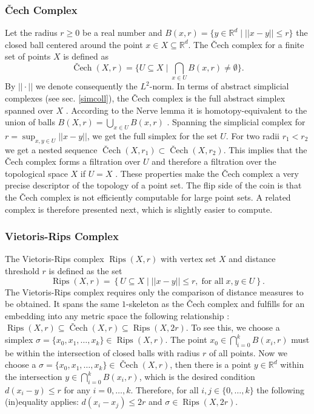 \documentclass[runningheads]{llncs}
\DeclareMathOperator{\Cech}{\text{\v{C}ech}}
\DeclareMathOperator{\Rips}{\text{Rips}}
\begin{document}
\subsubsection{\v{C}ech Complex \cite{bauer2017morse}} Let the radius $r \geq 0$ be a real number and $B(x,r) = \{y \in \mathbb{R}^d \; | \; ||x-y|| \leq r\}$ the closed ball centered around the point $x \in X \subseteq \mathbb{R}^d$. The \v{C}ech complex for a finite set of points $X$ is defined as
\begin{equation}
  \Cech(X,r) = \{ U \subseteq X  \; \rvert \; \bigcap_{x\in U}B(x,r) \neq \emptyset \}.
\end{equation}
By $||\cdot||$ we denote consequently the $L^2$-norm. In terms of abstract simplicial complexes (see sec. \ref{simcoll}), the \v{C}ech complex is the full abstract simplex spanned over $X$ \cite{bauer2017morse}. According to the Nerve lemma it is homotopy-equivalent to the union of balls $B(X,r) = \bigcup_{x \in U} B(x,r)$ \cite{borsuk}. Spanning the simplicial complex for $r = \sup_{x,y \in U} ||x-y||$, we get the full simplex for the set $U$. For two radii $r_1 < r_2$ we get a nested sequence $\Cech(X,r_1) \subset \Cech(X,r_2)$. This implies that the \v{C}ech complex forms a filtration over $U$ and therefore a filtration over the topological space $X$ if $U = X$ \cite{bauer2017morse}. These properties make the \v{C}ech complex a very precise descriptor of the topology of a point set. The flip side of the coin is that the \v{C}ech complex is not efficiently computable for large point sets. A related complex is therefore presented next, which is slightly easier to compute.

\subsubsection{Vietoris-Rips Complex \cite{boissonnat2018geometric}} The Vietoris-Rips complex $\Rips(X,r)$ with vertex set $X$ and distance threshold $r$ is defined as the set
\begin{equation}
  \label{rips}
\Rips(X,r) = \left\{ U \subseteq X \; \bigg\rvert \; ||x-y|| \leq r, \; \text{for all} \; x,y \in U \right\}.
\end{equation}
The Vietoris-Rips complex requires only the comparison of distance measures to be obtained. It spans the same $1$-skeleton as the \v{C}ech complex and fulfills for an embedding into any metric space the following relationship \cite[p.~15]{boissonnat2018geometric}: $\Rips(X,r)\subseteq \Cech(X,r) \subseteq \Rips(X,2r).$ To see this, we choose a simplex $\sigma = \{x_0,x_1,\ldots,x_k\} \in \Rips(X,r)$. The point $x_0 \in \bigcap_{i=0}^{k}B(x_i,r)$ must be within the intersection of closed balls with radius $r$ of all points. Now we choose a $\sigma = \{x_0,x_1,\ldots,x_k\} \in \Cech(X,r)$, then there is a point $y \in \mathbb{R}^d$ within the intersection $y \in \bigcap_{i=0}^{k}B(x_i,r)$, which is the desired condition $d(x_i-y) \leq r$ for any $i = 0,\ldots,k$. Therefore, for all $i,j \in \{0,\ldots,k\}$ the following (in)equality applies: $d(x_i-x_j) \leq 2r$ and $\sigma \in \Rips(X,2r)$.
\end{document}

